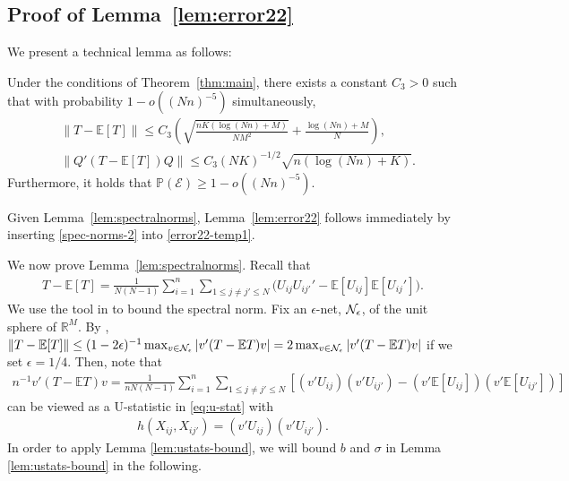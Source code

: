 \documentclass[preprint,11pt]{article}
\newcommand{\mbb}{\mathbb}
\newcommand{\mcal}{\mathcal}
\numberwithin{equation}{section}
\begin{document}
\subsection{Proof of Lemma~\ref{lem:error22}}\label{sec:pf-lem:error22}

We present a technical lemma as follows: 
\begin{lemma} \label{lem:spectralnorms}
Under the conditions of Theorem~\ref{thm:main}, 
there exists a constant $C_3>0$ such that with probability $1-o((Nn)^{-5})$ simultaneously, 
\begin{align} 
   &\|T-\mbb{E}[T]\|\le C_3\left(\sqrt{\frac{nK(\log (Nn)+M)}{NM^2}}+\frac{\log (Nn)+M}{N}\right), \label{spec-norms-1}\\
    &\|Q'(T-\mbb{E}[T])Q\|\le C_3(NK)^{-1/2}\sqrt{n(\log(Nn)+K)}. \label{spec-norms-2}
\end{align}
Furthermore, it holds that $\mbb{P}(\mcal{E})\ge 1-o((Nn)^{-5})$.
\end{lemma}

Given Lemma~\ref{lem:spectralnorms}, Lemma~\ref{lem:error22} follows immediately by inserting \eqref{spec-norms-2} into \eqref{error22-temp1}.

\bigskip

We now prove Lemma~\ref{lem:spectralnorms}. Recall that
\begin{align*}
    T-\mathbb{E}[T] 
= \frac{1}{N(N-1)}\sum_{i=1}^n \sum_{1\leq j\neq j'\leq N}\bigl(U_{ij}U_{ij'}'  - \mbb{E}[U_{ij}]\mbb{E}[U_{ij}']\bigr).
\end{align*}
We use the tool in \cite{vershynin2010introduction} to bound the spectral norm. Fix an $\epsilon$-net, ${\cal N}_\epsilon$, of the unit sphere of $\mathbb{R}^M$. By \cite[Lemma 5.4]{vershynin2010introduction}, $\|T-\mathbb{E}[T]\|\leq (1-2\epsilon)^{-1}\max_{v\in{\cal N}_\epsilon}|v'(T-\mathbb{E}T)v|=2\max_{v\in{\cal N}_\epsilon}|v'(T-\mathbb{E}T)v|$ if we set $\epsilon=1/4$. Then, note that
\begin{align*}
    n^{-1}v'(T-\mathbb{E}T)v=\frac{1}{nN(N-1)}\sum_{i=1}^n \sum_{1\leq j\neq j'\leq N}\left[(v'U_{ij})(v'U_{ij'})-(v'\mbb{E}[U_{ij}])(v'\mbb{E}[U_{ij'}])\right]
\end{align*}
can be viewed as a U-statistic in \eqref{eq:u-stat} with
\begin{align*}
    h(X_{ij},X_{ij'})=(v'U_{ij})(v'U_{ij'}).
\end{align*}
In order to apply Lemma \ref{lem:ustats-bound}, we will bound $b$ and $\sigma$ in Lemma \ref{lem:ustats-bound} in the following.
\end{document}
